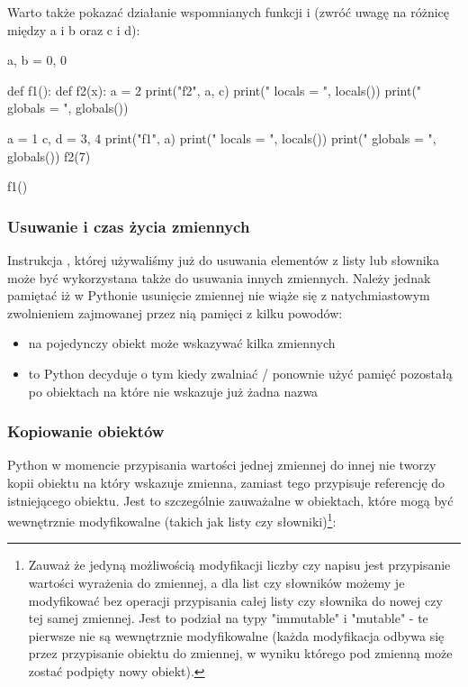 \begin{teacherOnly} Warto także pokazać działanie wspomnianych funkcji  i  (zwróć uwagę na różnicę między a i b oraz c i d):
\begin{CodeFrame*}[python]{}
a, b = 0, 0

def f1():
    def f2(x):
       a = 2
       print("f2", a, c)
       print(" locals  = ", locals())
       print(" globals = ", globals())
    
    a = 1
    c, d = 3, 4
    print("f1", a)
    print(" locals  = ", locals())
    print(" globals = ", globals())
    f2(7)

f1()
\end{CodeFrame*}
\end{teacherOnly}

\subsubsection{Usuwanie i czas życia zmiennych}

Instrukcja , której używaliśmy już do usuwania elementów z listy lub słownika może być wykorzystana także do usuwania innych zmiennych.
Należy jednak pamiętać iż w Pythonie usunięcie zmiennej nie wiąże się z natychmiastowym zwolnieniem zajmowanej przez nią pamięci z kilku powodów:
\begin{itemize}
\item na pojedynczy obiekt może wskazywać kilka zmiennych
\item to Python decyduje o tym kiedy zwalniać / ponownie użyć pamięć pozostałą po obiektach na które nie wskazuje już żadna nazwa
\end{itemize}

\subsubsection{Kopiowanie obiektów}

Python w momencie przypisania wartości jednej zmiennej do innej nie tworzy kopii obiektu na który wskazuje zmienna, zamiast tego przypisuje referencję do istniejącego obiektu.
Jest to szczególnie zauważalne w obiektach, które mogą być wewnętrznie modyfikowalne (takich jak listy czy słowniki)\footnote{
	Zauważ że jedyną możliwością modyfikacji liczby czy napisu jest przypisanie wartości wyrażenia do zmiennej,
	a dla list czy słowników możemy je modyfikować bez operacji przypisania całej listy czy słownika do nowej czy tej samej zmiennej.
	Jest to podział na typy "immutable" i "mutable" - te pierwsze nie są wewnętrznie modyfikowalne
	(każda modyfikacja odbywa się przez przypisanie obiektu do zmiennej, w wyniku którego pod zmienną może zostać podpięty nowy obiekt).
}:

